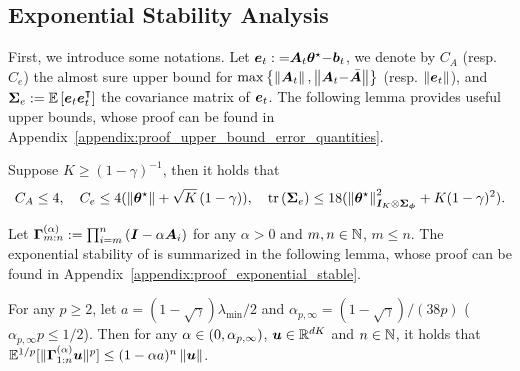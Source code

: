 \subsection{Exponential Stability Analysis}
First, we introduce some notations.
Let ${\bm{e}}_t:{=}{{\bm{A}}}_t{\bm{\theta}}^{\star}{-}{{\bm{b}}}_t$,
we denote by $C_{A}$ (resp. $C_{e}$) the almost sure upper bound for $\max\left\{{\left\|{{\bm{A}}_t}\right\|, \left\|{{\bm{A}}_t{-}\bar{{\bm{A}}}}\right\|}\right\}$ (resp. $\left\|{{\bm{e}}_t}\right\|$), and ${\bm{\Sigma}}_{e}:={\mathbb E}\left[{{\bm{e}}_t{\bm{e}}_t^{\intercal}}\right]$ the covariance matrix of ${\bm{e}}_t$.
The following lemma provides useful upper bounds, whose proof can be found in Appendix~\ref{appendix:proof_upper_bound_error_quantities}.
\begin{lemma}\label{lem:upper_bound_error_quantities}
Suppose $K\geq(1-\gamma)^{-1}$, then it holds that
    \begin{equation*}
       C_{A}\leq 4,\quad C_{e}\leq 4(\left\|{{\bm{\theta}}^{\star}}\right\|+\sqrt{K}\left({1-\gamma}\right)),\quad\operatorname{tr}\left({{\bm{\Sigma}}_{e}}\right)\leq 18(\left\|{{\bm{\theta}}^{\star}}\right\|_{{\bm{I}}_K\otimes{\bm{\Sigma}}_{{\bm{\phi}}}}^2+K(1-\gamma)^2).
    \end{equation*}
\end{lemma}
Let ${\bm{\Gamma}}_{m:n}^{(\alpha)}:=\prod_{i=m}^n\left({{\bm{I}}-\alpha{\bm{A}}_{i}}\right)$ for any $\alpha>0$ and $m,n\in{\mathbb N}$, $m\leq n$.
The exponential stability of {\LCTD} is summarized in the following lemma, whose proof can be found in Appendix~\ref{appendix:proof_exponential_stable}.
\begin{lemma}\label{lem:exponential_stable}
For any $p\geq 2$, let $a=(1-\sqrt\gamma)\lambda_{\min}/2$ and $\alpha_{p,\infty}=(1-\sqrt\gamma)/(38p)$ ($\alpha_{p,\infty}p\leq 1/2$).
Then for any $\alpha\in\left({0,\alpha_{p,\infty}}\right)$, ${\bm{u}}\in{\mathbb R}^{dK}$ and $n\in{\mathbb N}$, it holds that ${\mathbb E}^{1/p}[\|{\bm{\Gamma}}_{1:n}^{(\alpha)}{\bm{u}}\|^p]\leq (1-\alpha a)^n \left\|{{\bm{u}}}\right\|$.
\end{lemma}
